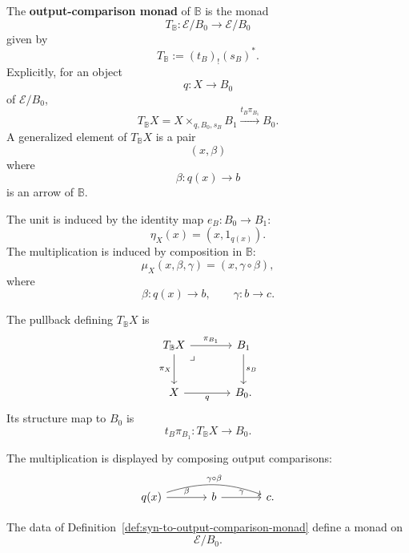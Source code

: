 \begin{definition}
\label{def:syn-to-output-comparison-monad}
    The \textbf{output-comparison monad} of \(\mathbb B\) is the monad
    \[
        T_{\mathbb B}:\mathcal E/B_0\to\mathcal E/B_0
    \]
    given by
    \[
        T_{\mathbb B}:=(t_B)_!(s_B)^*.
    \]
    Explicitly, for an object
    \[
        q:X\to B_0
    \]
    of \(\mathcal E/B_0\),
    \[
        T_{\mathbb B}X
        =
        X\times_{q,B_0,s_B}B_1
        \xrightarrow{t_B\pi_{B_1}}
        B_0 .
    \]
    A generalized element of \(T_{\mathbb B}X\) is a pair
    \[
        (x,\beta)
    \]
    where
    \[
        \beta:q(x)\to b
    \]
    is an arrow of \(\mathbb B\).

    The unit is induced by the identity map \(e_B:B_0\to B_1\):
    \[
        \eta_X(x)=(x,1_{q(x)}).
    \]
    The multiplication is induced by composition in \(\mathbb B\):
    \[
        \mu_X(x,\beta,\gamma)=(x,\gamma\circ\beta),
    \]
    where
    \[
        \beta:q(x)\to b,
        \qquad
        \gamma:b\to c.
    \]
\end{definition}

The pullback defining \(T_{\mathbb B}X\) is
\[
\begin{tikzcd}[column sep=large, row sep=large]
    T_{\mathbb B}X
        \arrow[r, "\pi_{B_1}"]
        \arrow[d, "\pi_X"']
        \arrow[dr, phantom, "\lrcorner", very near start]
    &
    B_1
        \arrow[d, "s_B"]
    \\
    X
        \arrow[r, "q"']
    &
    B_0 .
\end{tikzcd}
\]
Its structure map to \(B_0\) is
\[
    t_B\pi_{B_1}:T_{\mathbb B}X\to B_0.
\]

The multiplication is displayed by composing output comparisons:
\[
\begin{tikzcd}[column sep=large, row sep=large]
    q(x)
        \arrow[r, "\beta"]
        \arrow[rr, bend left=18, "\gamma\circ\beta"]
    &
    b
        \arrow[r, "\gamma"]
    &
    c .
\end{tikzcd}
\]

\begin{proposition}
\label{prop:syn-to-output-comparison-monad}
    The data of Definition~\ref{def:syn-to-output-comparison-monad} define a
    monad on
    \[
        \mathcal E/B_0.
    \]
\end{proposition}

